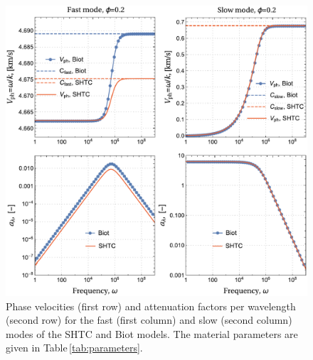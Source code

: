 \documentclass[3p,times,table]{article}
\begin{document}
\begin{figure}[t]
	\begin{center}
			\includegraphics[draft=false,trim=0 0 0 0,clip, 
			scale=0.42]{Figures/Vph-AttenuationLog}
		\caption{Phase velocities (first row) and attenuation factors per 
			wavelength (second row) for the fast (first column) and slow 
			(second column) modes of the SHTC and Biot models. The material 
			parameters are given in Table\,\ref{tab:parameters}.  
		}  
		\label{fig:Vph.Attenuation}
	\end{center}
\end{figure}



%		
\end{document}
